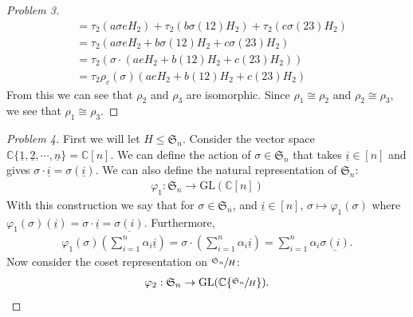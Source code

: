 \documentclass[titlepage]{article}
\theoremstyle{plain}
\theoremstyle{definition}
\theoremstyle{remark}
\theoremstyle{exercise-style}
\numberwithin{equation}{section}
\numberwithin{theorem}{section}
\numberwithin{remark}{section}
\begin{document}
\begin{proof}[Problem 3]
\begin{align}
        &= \tau_2(a\sigma eH_2) + \tau_2(b\sigma (12)H_2) + \tau_2(c\sigma(23)H_2) \\
        &= \tau_2(a\sigma eH_2 + b \sigma (12)H_2 + c \sigma (23)H_2) \\
        &= \tau_2 (\sigma \cdot (a eH_2 + b(12)H_2 + c(23)H_2)) \\
        &= \tau_2 \rho_c(\sigma)(a eH_2 + b(12)H_2 + c(23)H_2)
    \end{align}
    From this we can see that $\rho_2$ and $\rho_3$ are isomorphic. Since $\rho_1 \cong \rho_2$ and $\rho_2 \cong \rho_3$, we see that $\rho_1 \cong \rho_3$.
\end{proof}

\begin{proof}[Problem 4]
    First we will let $H \leqslant \mathfrak{S}_n$. Consider the vector space $\mathbb{C}\{ \underline{1}, \underline{2}, \cdots, \underline{n} \} = \mathbb{C}[n]$. We can define the action of $\sigma \in \mathfrak{S}_n$ that takes $\underline{i} \in [n]$ and gives $\sigma \cdot \underline{i} = \sigma(\underline{i})$. We can also define the natural representation of $\mathfrak{S}_n$:
    \begin{align}
        \varphi_1 : \mathfrak{S}_n \to \mathrm{GL}(\mathbb{C}[n])
    \end{align}
    With this construction we say that for $\sigma \in \mathfrak{S}_n$, and $\underline{i} \in [n]$, $\sigma \mapsto \varphi_1(\sigma)$ where $\varphi_1(\sigma)(\underline{i}) = \sigma \cdot\underline{i} = \underline{\sigma(i)}$. Furthermore,
    \begin{align}
        \varphi_1(\sigma)\left( \sum_{i=1}^n \alpha_i \underline{i} \right) = \sigma \cdot \left( \sum_{i=1}^n \alpha_i \underline{i} \right) = \sum_{i=1}^n \alpha_i \underline{\sigma(i)}.
    \end{align}
    Now consider the coset representation on $\sfrac{\mathfrak{S}_n}{H}$:
    \begin{align}
        \varphi_2 : \mathfrak{S}_n \to \mathrm{GL}(\mathbb{C} \{ \sfrac{\mathfrak{S}_n}{H} \}).
    \end{align}

\end{proof}
\end{document}
